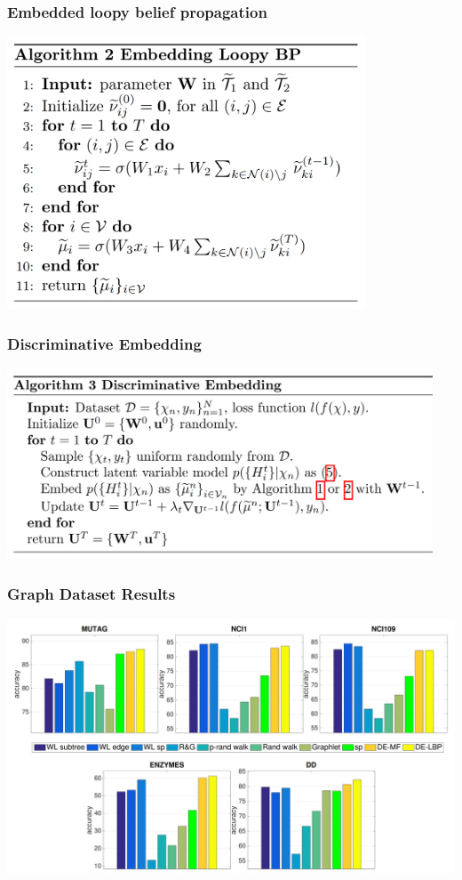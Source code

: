 \documentclass{beamer}
\begin{document}
    \begin{frame}
        \frametitle{Embedded loopy belief propagation}
        \begin{center}
            \includegraphics[width=0.8\textwidth]{elbp.png}
        \end{center}
    \end{frame}

    \begin{frame}
        \frametitle{Discriminative Embedding}
        \begin{center}
            \includegraphics[width=0.95\textwidth]{disc_embedding.png}
        \end{center}
    \end{frame}

    \begin{frame}
        \frametitle{Graph Dataset Results}
        \begin{center}
            \includegraphics[width=\textwidth]{graph_results.png}
        \end{center}
    \end{frame}
\end{document}
